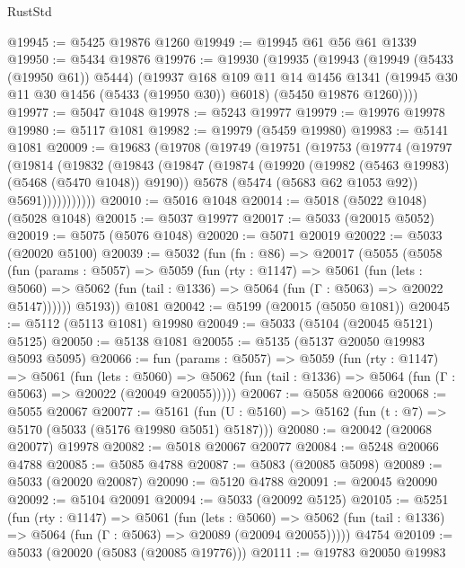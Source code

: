 \begin{lexlean}{RustStd}
\begin{coremodule}
@19945 := @5425 @19876 @1260
@19949 := @19945 @61 @56 @61 @1339
@19950 := @5434 @19876
@19976 := @19930
    (@19935
      (@19943
        (@19949 (@5433 (@19950 @61)) @5444)
        (@19937
          @168
          @109
          @11
          @14
          @1456
          @1341
          (@19945 @30 @11 @30 @1456 (@5433 (@19950 @30)) @6018)
          (@5450 @19876 @1260))))
@19977 := @5047 @1048
@19978 := @5243 @19977
@19979 := @19976 @19978
@19980 := @5117 @1081
@19982 := @19979 (@5459 @19980)
@19983 := @5141 @1081
@20009 := @19683
    (@19708
      (@19749
        (@19751
          (@19753
            (@19774
              (@19797
                (@19814
                  (@19832
                    (@19843
                      (@19847
                        (@19874
                          (@19920 (@19982 (@5463 @19983) (@5468 (@5470 @1048)) @9190))
                          @5678
                          (@5474 (@5683 @62 @1053 @92))
                          @5691)))))))))))
@20010 := @5016 @1048
@20014 := @5018 (@5022 @1048) (@5028 @1048)
@20015 := @5037 @19977
@20017 := @5033 (@20015 @5052)
@20019 := @5075 (@5076 @1048)
@20020 := @5071 @20019
@20022 := @5033 (@20020 @5100)
@20039 := @5032
    (fun (fn : @86) =>
    @20017
      (@5055
        (@5058
          (fun (params : @5057) =>
          @5059
            (fun (rty : @1147) =>
            @5061
              (fun (lets : @5060) =>
              @5062 (fun (tail : @1336) => @5064 (fun (Γ : @5063) => @20022 @5147))))))
        @5193))
    @1081
@20042 := @5199 (@20015 (@5050 @1081))
@20045 := @5112 (@5113 @1081) @19980
@20049 := @5033 (@5104 (@20045 @5121) @5125)
@20050 := @5138 @1081
@20055 := @5135 (@5137 @20050 @19983 @5093 @5095)
@20066 := fun (params : @5057) =>
  @5059
    (fun (rty : @1147) =>
    @5061
      (fun (lets : @5060) =>
      @5062 (fun (tail : @1336) => @5064 (fun (Γ : @5063) => @20022 (@20049 @20055)))))
@20067 := @5058 @20066
@20068 := @5055 @20067
@20077 := @5161
    (fun (U : @5160) => @5162 (fun (t : @7) => @5170 (@5033 (@5176 @19980 @5051) @5187)))
@20080 := @20042 (@20068 @20077) @19978
@20082 := @5018 @20067 @20077
@20084 := @5248 @20066 @4788
@20085 := @5085 @4788
@20087 := @5083 (@20085 @5098)
@20089 := @5033 (@20020 @20087)
@20090 := @5120 @4788
@20091 := @20045 @20090
@20092 := @5104 @20091
@20094 := @5033 (@20092 @5125)
@20105 := @5251
    (fun (rty : @1147) =>
    @5061
      (fun (lets : @5060) =>
      @5062 (fun (tail : @1336) => @5064 (fun (Γ : @5063) => @20089 (@20094 @20055)))))
    @4754
@20109 := @5033 (@20020 (@5083 (@20085 @19776)))
@20111 := @19783 @20050 @19983

\end{coremodule}
\end{lexlean}
